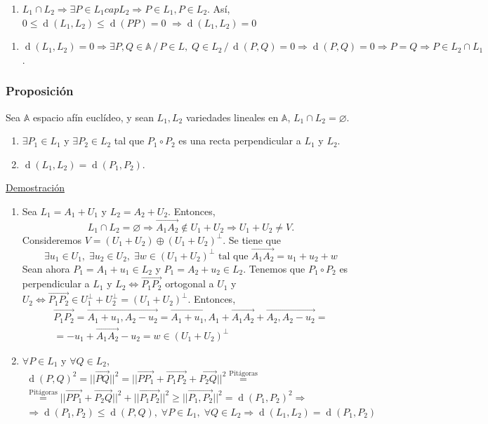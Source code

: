 \documentclass[12pt, a4paper, ones, notitlepage, openany,titlepage]{article}
\newcommand{\dobleimplicacion}[2]{
	\begin{enumerate}[label=$\Rightarrow/$]
		\item #1
	\end{enumerate}
	\begin{enumerate}[label=$\Leftarrow/$]
		\item #2
	\end{enumerate}
}
\newcommand{\demostracion}{\noindent\underline{Demostración}}
\newcommand{\distancia}[1]{\operatorname{d}(#1)}
\begin{document}
\dobleimplicacion{
$L_1 \cap L_2 \Longrightarrow \exists P \in L_1 cap L_2 \Longrightarrow P \in L_1, P \in L_2$. Así, $0 \le \distancia{L_1, L_2} \le \distancia{PP} = 0$ $\Longrightarrow \distancia{L_1,L_2} = 0$
}{
$\distancia{L_1, L_2} = 0 \Longrightarrow \exists P,Q \in \mathbb{A} \,/\, P \in L, \; Q \in L_2 \,/\, \distancia{P,Q} = 0 \Longrightarrow \distancia{P,Q} = 0 \Longrightarrow P = Q \Longrightarrow P \in L_2 \cap L_1$.
}

\subsubsection{Proposición}
Sea $\mathbb{A}$ espacio afín euclídeo, y sean $L_1, L_2$ variedades lineales en $\mathbb{A}$, $L_1 \cap L_2 = \varnothing$.
\begin{enumerate}[label=(\arabic*)]
	\item $\exists P_1 \in L_1$ y $\exists P_2 \in L_2$ tal que $P_1 \circ P_2$ es una recta perpendicular a $L_1$ y $L_2$.
	\item $\distancia{L_1,L_2} = \distancia{P_1,P_2}$.
\end{enumerate}
\demostracion

\begin{enumerate}[label=(\arabic*)]
	\item Sea $L_1 = A_1 + U_1$ y $L_2 = A_2 + U_2$. Entonces,
	$$
	L_1 \cap L_2 = \varnothing \Longrightarrow \overrightarrow{A_1 A_2} \notin U_1 + U_2 \Longrightarrow U_1 + U_2 \neq V.
	$$
	Consideremos $V = (U_1 + U_2) \oplus (U_1 + U_2)^\perp$. Se tiene que
	$$
	\exists u_1 \in U_1, \; \exists u_2 \in U_2, \; \exists w \in (U_1 + U_2)^\perp \text{ tal que } \overrightarrow{A_1 A_2} = u_1 + u_2 + w
	$$
	Sean ahora $P_1 = A_1 + u_1 \in L_2$ y $P_1 = A_2 + u_2 \in L_2$. Tenemos que $P_1 \circ P_2$ es perpendicular a $L_1$ y $L_2 \Longleftrightarrow \overrightarrow{P_1 P_2}$ ortogonal a $U_1$ y $U_2 \Longleftrightarrow \overrightarrow{P_1 P_2} \in U_1^\perp + U_2^\perp = (U_1 + U_2)^\perp$. Entonces,
	\begin{gather*}
	\overrightarrow{P_1 P_2} = \overrightarrow{A_1 + u_1 , A_2 - u_2} = \overrightarrow{A_1 + u_1, A_1} + \overrightarrow{A_1 A_2} + \overrightarrow{A_2, A_2 - u_2} = \\
	= -u_1 + \overrightarrow{A_1 A_2} - u_2 = w \in (U_1 + U_2)^\perp
	\end{gather*}

	\item $\forall P \in L_1$ y $\forall Q \in L_2$,
	\begin{gather*}
	\distancia{P, Q}^2 = ||\overrightarrow{PQ}||^2 = || \overrightarrow{PP_1} + \overrightarrow{P_1 P_2} + \overrightarrow{P_2 Q} ||^2 \stackrel{\text{Pitágoras}}{=} \\
	\stackrel{\text{Pitágoras}}{=} || \overrightarrow{PP_1} + \overrightarrow{P_2 Q}||^2 + ||\overrightarrow{P_1 P_2}||^2 \ge ||\overrightarrow{P_1,P_2}||^2 = \distancia{P_1,P_2}^2 \Longrightarrow \\ \Longrightarrow \distancia{P_1,P_2} \le \distancia{P,Q}, \; \forall P \in L_1, \; \forall Q \in L_2
	\Longrightarrow \distancia{L_1, L_2} = \distancia{P_1, P_2}
	\end{gather*}
\end{enumerate}
\end{document}
